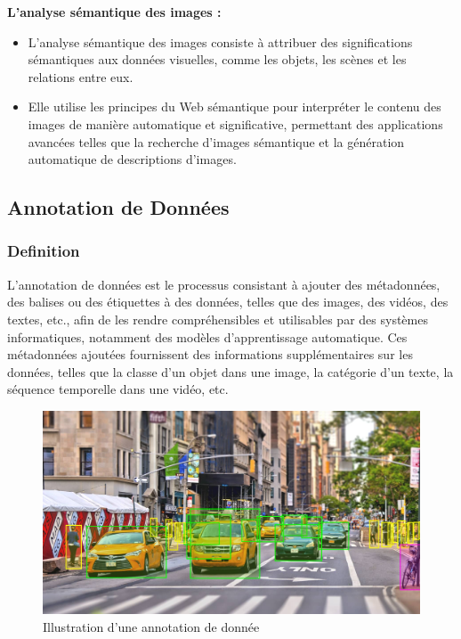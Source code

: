 \documentclass{article}
\begin{document}
	\textemdash \textbf{ L'analyse sémantique des images :}
	\begin{itemize}
		\item L'analyse sémantique des images consiste à attribuer des significations sémantiques aux données visuelles, comme les objets, les scènes et les relations entre eux.
		\item Elle utilise les principes du Web sémantique pour interpréter le contenu des images de manière automatique et significative, permettant des applications avancées telles que la recherche d'images sémantique et la génération automatique de descriptions d'images.
	\end{itemize}
	
	\subsection{Annotation de Données}
	\subsubsection{Definition}
	\quad L'annotation de données est le processus consistant à ajouter des métadonnées, des balises ou des étiquettes à des données, telles que des images, des vidéos, des textes, etc., afin de les rendre compréhensibles et utilisables par des systèmes informatiques, notamment des modèles d'apprentissage automatique. Ces métadonnées ajoutées fournissent des informations supplémentaires sur les données, telles que la classe d'un objet dans une image, la catégorie d'un texte, la séquence temporelle dans une vidéo, etc.
	
	
	\begin{figure}[htbp]
		\begin{center}
			\begin{minipage}[b]{0.7\textwidth}
				\centering
				\includegraphics[width=\textwidth]{img/13.jpeg}
				\caption{Illustration d'une annotation de donnée}
			\end{minipage}
		\end{center}
	\end{figure}
	
\end{document}
